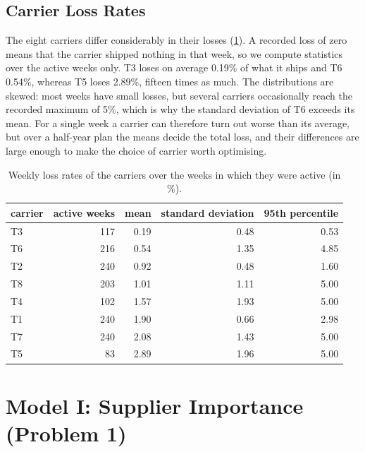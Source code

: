 \documentclass[11pt,a4paper]{article}
\begin{document}
\subsection{Carrier Loss Rates}\label{sec:carriers}
The eight carriers differ considerably in their losses (\cref{tab:carriers}).
A recorded loss of zero means that the carrier shipped nothing in that week, so we compute statistics over the active weeks only.
T3 loses on average 0.19\% of what it ships and T6 0.54\%, whereas T5 loses 2.89\%, fifteen times as much.
The distributions are skewed: most weeks have small losses, but several carriers occasionally reach the recorded maximum of 5\%, which is why the standard deviation of T6 exceeds its mean.
For a single week a carrier can therefore turn out worse than its average, but over a half-year plan the means decide the total loss, and their differences are large enough to make the choice of carrier worth optimising.

\begin{table}[ht]
\centering
\caption{Weekly loss rates of the carriers over the weeks in which they were active (in \%).}\label{tab:carriers}
\small
\begin{tabular}{lrrrr}
\toprule
carrier & active weeks & mean & standard deviation & 95th percentile \\
\midrule
T3 & 117 & 0.19 & 0.48 & 0.53 \\
T6 & 216 & 0.54 & 1.35 & 4.85 \\
T2 & 240 & 0.92 & 0.48 & 1.60 \\
T8 & 203 & 1.01 & 1.11 & 5.00 \\
T4 & 102 & 1.57 & 1.93 & 5.00 \\
T1 & 240 & 1.90 & 0.66 & 2.98 \\
T7 & 240 & 2.08 & 1.43 & 5.00 \\
T5 & 83 & 2.89 & 1.96 & 5.00 \\
\bottomrule
\end{tabular}
\end{table}

\section{Model I: Supplier Importance (Problem 1)}\label{sec:q1}
\end{document}
